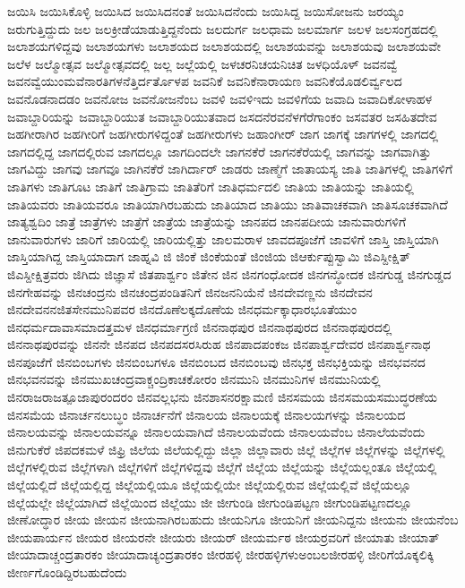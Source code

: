 {ಜಯಿಸಿ
ಜಯಿಸಿಕೊಳ್ಳಿ
ಜಯಿಸಿದ
ಜಯಿಸಿದನಂತೆ
ಜಯಿಸಿದನೆಂದು
ಜಯಿಸಿದ್ದ
ಜಯಿಸೋಜನು
ಜರಯ್ಯಂ
ಜರುಗುತ್ತಿದ್ದುದು
ಜಲ
ಜಲಕ್ರೀಡೆಯಾಡುತ್ತಿದ್ದನೆಂದು
ಜಲದುರ್ಗ
ಜಲಧಾಮ
ಜಲಮಾರ್ಗ
ಜಲಳ
ಜಲಸಂಗ್ರಹದಲ್ಲಿ
ಜಲಾಶಯಗಳಿದ್ದವು
ಜಲಾಶಯಗಳು
ಜಲಾಶಯದ
ಜಲಾಶಯದಲ್ಲಿ
ಜಲಾಶಯವನ್ನು
ಜಲಾಶಯವು
ಜಲಾಶಯವೇ
ಜಲೆಳ
ಜಲ್ಮೋತ್ಸವ
ಜಲ್ಮೋತ್ಸವದಲ್ಲಿ
ಜಲ್ಲ
ಜಲ್ಲೆಯಲ್ಲಿ
ಜಳಚರನಿಚಯನಿಚಿತ
ಜಳಧಿಯೊಳ್
ಜವನವ್ವೆ
ಜವನವ್ವೆಯುಂಮವೆನಾರತಿಗಳನೆತ್ತಿರ್ದರ್ತೊಳಪ
ಜವನಿಕೆ
ಜವನಿಕೆನಾರಾಯಣ
ಜವನಿಕೆಯೊಡಲಿರ್ವ್ವಲದ
ಜವನೊಡನಾದಡಂ
ಜವನೋಜ
ಜವನೋಜನೆಂಬ
ಜವಳಿ
ಜವಳಿಇದು
ಜವಳಿಗೆಯ
ಜವಾದಿ
ಜವಾದಿಕೋಳಾಹಳ
ಜವಾಬ್ದಾರಿಯನ್ನು
ಜವಾಬ್ದಾರಿಯುತ
ಜವಾಬ್ದಾರಿಯುತವಾದ
ಜಸದನೆರವನೆಳಗೆರೆಗಾಂಕಂ
ಜಸವತರ
ಜಸಹಿತದೇವ
ಜಹಗೀರಾಗಿರ
ಜಹಗೀರಿಗೆ
ಜಹಗೀರುಗಳಿದ್ದಂತೆ
ಜಹಗೀರುಗಳು
ಜಹಾಂಗೀರ್
ಜಾಗ
ಜಾಗಕ್ಕೆ
ಜಾಗಗಳಲ್ಲಿ
ಜಾಗದಲ್ಲಿ
ಜಾಗದಲ್ಲಿದ್ದ
ಜಾಗದಲ್ಲಿರುವ
ಜಾಗದಲ್ಲೂ
ಜಾಗದಿಂದಲೇ
ಜಾಗನಕೆರೆ
ಜಾಗನಕೆರೆಯಲ್ಲಿ
ಜಾಗವನ್ನು
ಜಾಗವಾಗಿತ್ತು
ಜಾಗವಿದ್ದು
ಜಾಗವು
ಜಾಗವೂ
ಜಾಗಿನಕೆರೆ
ಜಾಗಿರ್ದಾರ್
ಜಾಡರು
ಜಾಣ್ಮೆಗೆ
ಜಾತಾಯಸ್ಯ
ಜಾತಿ
ಜಾತಿಗಳಲ್ಲಿ
ಜಾತಿಗಳಿಗೆ
ಜಾತಿಗಳು
ಜಾತಿಗೂಟ
ಜಾತಿಗೆ
ಜಾತಿಗ್ರಾಮ
ಜಾತಿತೆರಿಗೆ
ಜಾತಿಧರ್ಮದಲಿ
ಜಾತಿಯ
ಜಾತಿಯನ್ನು
ಜಾತಿಯಲ್ಲಿ
ಜಾತಿಯವರು
ಜಾತಿಯವರೂ
ಜಾತಿಯಾಗಿರಬಹುದು
ಜಾತಿಯಾದ
ಜಾತಿಯು
ಜಾತಿವಾಚಕವಾಗಿ
ಜಾತಿಸೂಚಕವಾಗಿದೆ
ಜಾತ್ಯಶ್ವದಿಂ
ಜಾತ್ರೆ
ಜಾತ್ರೆಗಳು
ಜಾತ್ರೆಗೆ
ಜಾತ್ರೆಯ
ಜಾತ್ರೆಯನ್ನು
ಜಾನಪದ
ಜಾನಪದೀಯ
ಜಾನುವಾರುಗಳಿಗೆ
ಜಾನುವಾರುಗಳು
ಜಾರಿಗೆ
ಜಾರಿಯಲ್ಲಿ
ಜಾರಿಯಲ್ಲಿತ್ತು
ಜಾಲಮರಾಳ
ಜಾವದಪೂಜೆಗೆ
ಜಾವಳಿಗೆ
ಜಾಸ್ತಿ
ಜಾಸ್ತಿಯಾಗಿ
ಜಾಸ್ತಿಯಾಗಿದ್ದ
ಜಾಸ್ತಿಯಾದಾಗ
ಜಾಹ್ನವಿ
ಜಿ
ಜಿಂಕೆ
ಜಿಂಕೆಯಂತೆ
ಜಿಂಜಿಯ
ಜಿಆರ್ಕುಪ್ಪುಸ್ವಾಮಿ
ಜಿಎಸ್ದೀಕ್ಷಿತ್
ಜಿಎಸ್ದೀಕ್ಷಿತ್ರವರು
ಜಿಗಿದು
ಜಿಜ್ಞಾಸೆ
ಜಿತಪಾರ್ಶ್ವಂ
ಜಿತೇನ
ಜಿನ
ಜಿನಗಂಧೋದಕ
ಜಿನಗನ್ಧೋದಕ
ಜಿನಗುಡ್ಡ
ಜಿನಗುಡ್ಡದ
ಜಿನಗೇಹವನ್ನು
ಜಿನಚಂದ್ರನು
ಜಿನಚಂದ್ರಪಂಡಿತನಿಗೆ
ಜಿನಜನನಿಯೆನೆ
ಜಿನದೇವಣ್ಣನು
ಜಿನದೇವನ
ಜಿನದೇವನನಜಿತಸೇನಮುನಿಪವರ
ಜಿನದೊಣೆಲಕ್ಕದೊಣೆಯ
ಜಿನಧರ್ಮಕ್ಕಾಧಾರಭೂತೆಯುಂ
ಜಿನಧರ್ಮದಾವಾಸಮಾದತ್ತಮಳ
ಜಿನಧರ್ಮಾಗ್ರಣಿ
ಜಿನನಾಥಪುರ
ಜಿನನಾಥಪುರದ
ಜಿನನಾಥಪುರದಲ್ಲಿ
ಜಿನನಾಥಪುರವನ್ನು
ಜಿನನೇ
ಜಿನಪದ
ಜಿನಪದಸರಸಿರುಹ
ಜಿನಪಾದಪಂಕಜ
ಜಿನಪಾರ್ಶ್ವದೇವರ
ಜಿನಪಾರ್ಶ್ವನಾಥ
ಜಿನಪೂಜೆಗೆ
ಜಿನಬಿಂಬಗಳು
ಜಿನಬಿಂಬಗಳೂ
ಜಿನಬಿಂಬದ
ಜಿನಬಿಂಬವು
ಜಿನಭಕ್ತ
ಜಿನಭಕ್ತಿಯನ್ನು
ಜಿನಭವನದ
ಜಿನಭವನವನ್ನು
ಜಿನಮುಖಚಂದ್ರವಾಕ್ಚಂದ್ರಿಕಾಚಕೋರಂ
ಜಿನಮುನಿ
ಜಿನಮುನಿಗಳ
ಜಿನಮುನಿಯಲ್ಲಿ
ಜಿನರಾಜರಾಜತ್ಪೂಜಾಪುರಂದರಂ
ಜಿನವಲ್ಲಭನು
ಜಿನಶಾಸನರಕ್ಷಾಮಣಿ
ಜಿನಸಮಯ
ಜಿನಸಮಯಸಮುದ್ಧರಣೆಯ
ಜಿನಸಮೆಯ
ಜಿನಾರ್ಚನಲುಬ್ಧಂ
ಜಿನಾರ್ಚನೆಗೆ
ಜಿನಾಲಯ
ಜಿನಾಲಯಕ್ಕೆ
ಜಿನಾಲಯಗಳನ್ನು
ಜಿನಾಲಯದ
ಜಿನಾಲಯವನ್ನು
ಜಿನಾಲಯವನ್ನೂ
ಜಿನಾಲಯವಾಗಿದೆ
ಜಿನಾಲಯವೆಂದು
ಜಿನಾಲಯವೆಂಬ
ಜಿನಾಲೆಯವೆಂದು
ಜಿನುಗುಕೆರೆ
ಜಿಪದಕಮಳೆ
ಜಿಫ್ರಿ
ಜಿಲೆಯ
ಜಿಲೆಯಲ್ಲಿದ್ದು
ಜಿಲ್ಲಾ
ಜಿಲ್ಲಾವಾರು
ಜಿಲ್ಲೆ
ಜಿಲ್ಲೆಗಳ
ಜಿಲ್ಲೆಗಳನ್ನು
ಜಿಲ್ಲೆಗಳಲ್ಲಿ
ಜಿಲ್ಲೆಗಳಲ್ಲಿರುವ
ಜಿಲ್ಲೆಗಳಾಗಿ
ಜಿಲ್ಲೆಗಳಿಗೆ
ಜಿಲ್ಲೆಗಳಿದ್ದವು
ಜಿಲ್ಲೆಗೆ
ಜಿಲ್ಲೆಯ
ಜಿಲ್ಲೆಯನ್ನು
ಜಿಲ್ಲೆಯಲ್ಲಂತೂ
ಜಿಲ್ಲೆಯಲ್ಲಿ
ಜಿಲ್ಲೆಯಲ್ಲಿದೆ
ಜಿಲ್ಲೆಯಲ್ಲಿದ್ದ
ಜಿಲ್ಲೆಯಲ್ಲಿಯೂ
ಜಿಲ್ಲೆಯಲ್ಲಿಯೇ
ಜಿಲ್ಲೆಯಲ್ಲಿರುವ
ಜಿಲ್ಲೆಯಲ್ಲಿವೆ
ಜಿಲ್ಲೆಯಲ್ಲೂ
ಜಿಲ್ಲೆಯಲ್ಲೇ
ಜಿಲ್ಲೆಯಾಗಿದೆ
ಜಿಲ್ಲೆಯಿಂದ
ಜಿಲ್ಲೆಯು
ಜೀ
ಜೀಗುಂಡಿ
ಜೀಗುಂಡಿಪಟ್ಟಣ
ಜೀಗುಂಡಿಪಟ್ಟಣದಲ್ಲೂ
ಜೀಣೋದ್ಧಾರ
ಜೀಯ
ಜೀಯನ
ಜೀಯನಾಗಿರಬಹುದು
ಜೀಯನಿಗೂ
ಜೀಯನಿಗೆ
ಜೀಯನಿದ್ದನು
ಜೀಯನು
ಜೀಯನೆಂಬ
ಜೀಯಪಾರ್ಯನ
ಜೀಯರ
ಜೀಯರನೇ
ಜೀಯರು
ಜೀಯರ್
ಜೀಯರ್ಮಠ
ಜೀಯರ್ರವರಿಗೆ
ಜೀಯಾತು
ಜೀಯಾತ್
ಜೀಯಾದಾಚ್ಚಂದ್ರತಾರಕಂ
ಜೀಯಾದಾಚ್ಯಂದ್ರತಾರಕಂ
ಜೀರಹಳ್ಳಿ
ಜೀರಹಳ್ಳಿಗಳುಅಂಬಲಜೀರಹಳ್ಳಿ
ಜೀರಿಗೆಯೊಕ್ಕಲಿಕ್ಕಿ
ಜೀರ್ಣಗೊಂಡಿದ್ದಿರಬಹುದೆಂದು
}
